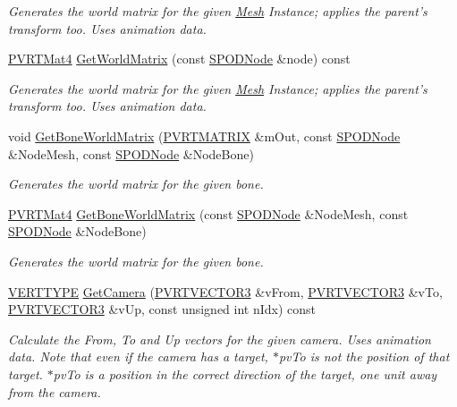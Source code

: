\begin{DoxyCompactItemize}
\begin{DoxyCompactList}\small\item\em Generates the world matrix for the given \hyperlink{class_mesh}{Mesh} Instance; applies the parent's transform too. Uses animation data. \end{DoxyCompactList}\item 
\hyperlink{struct_p_v_r_t_mat4}{P\+V\+R\+T\+Mat4} \hyperlink{class_c_p_v_r_t_model_p_o_d_a0e0fc98ee446caa808cae16f21ed8aa1}{Get\+World\+Matrix} (const \hyperlink{struct_s_p_o_d_node}{S\+P\+O\+D\+Node} \&node) const 
\begin{DoxyCompactList}\small\item\em Generates the world matrix for the given \hyperlink{class_mesh}{Mesh} Instance; applies the parent's transform too. Uses animation data. \end{DoxyCompactList}\item 
void \hyperlink{class_c_p_v_r_t_model_p_o_d_a6694249e9748720dcbc96ff3945dd367}{Get\+Bone\+World\+Matrix} (\hyperlink{class_p_v_r_t_m_a_t_r_i_xf}{P\+V\+R\+T\+M\+A\+T\+R\+I\+X} \&m\+Out, const \hyperlink{struct_s_p_o_d_node}{S\+P\+O\+D\+Node} \&Node\+Mesh, const \hyperlink{struct_s_p_o_d_node}{S\+P\+O\+D\+Node} \&Node\+Bone)
\begin{DoxyCompactList}\small\item\em Generates the world matrix for the given bone. \end{DoxyCompactList}\item 
\hyperlink{struct_p_v_r_t_mat4}{P\+V\+R\+T\+Mat4} \hyperlink{class_c_p_v_r_t_model_p_o_d_a55e36dee28766a434d0d74d8c220933e}{Get\+Bone\+World\+Matrix} (const \hyperlink{struct_s_p_o_d_node}{S\+P\+O\+D\+Node} \&Node\+Mesh, const \hyperlink{struct_s_p_o_d_node}{S\+P\+O\+D\+Node} \&Node\+Bone)
\begin{DoxyCompactList}\small\item\em Generates the world matrix for the given bone. \end{DoxyCompactList}\item 
\hyperlink{group___a_p_i___o_g_l_e_s_ga06da457b7d3e93368ab904f89e1396be}{V\+E\+R\+T\+T\+Y\+P\+E} \hyperlink{class_c_p_v_r_t_model_p_o_d_aa96ff6f192ed302b0f0b5461c2b266d9}{Get\+Camera} (\hyperlink{struct_p_v_r_t_v_e_c_t_o_r3f}{P\+V\+R\+T\+V\+E\+C\+T\+O\+R3} \&v\+From, \hyperlink{struct_p_v_r_t_v_e_c_t_o_r3f}{P\+V\+R\+T\+V\+E\+C\+T\+O\+R3} \&v\+To, \hyperlink{struct_p_v_r_t_v_e_c_t_o_r3f}{P\+V\+R\+T\+V\+E\+C\+T\+O\+R3} \&v\+Up, const unsigned int n\+Idx) const 
\begin{DoxyCompactList}\small\item\em Calculate the From, To and Up vectors for the given camera. Uses animation data. Note that even if the camera has a target, $\ast$pv\+To is not the position of that target. $\ast$pv\+To is a position in the correct direction of the target, one unit away from the camera. \end{DoxyCompactList}\item 

\end{DoxyCompactItemize}
